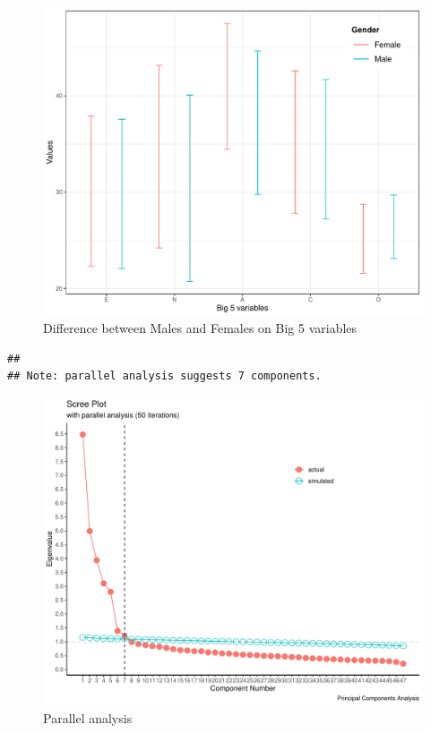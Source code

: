 \documentclass[
  english,
  man]{apa6}
\begin{document}
\begin{figure}
\centering
\includegraphics{final_project_files/figure-latex/errorbars-1.pdf}
\caption{\label{fig:errorbars}Difference between Males and Females on Big 5 variables}
\end{figure}

\begin{verbatim}
## 
## Note: parallel analysis suggests 7 components.
\end{verbatim}

\begin{figure}
\centering
\includegraphics{final_project_files/figure-latex/parallel-analysis-1.pdf}
\caption{\label{fig:parallel-analysis}Parallel analysis}
\end{figure}
\end{document}
